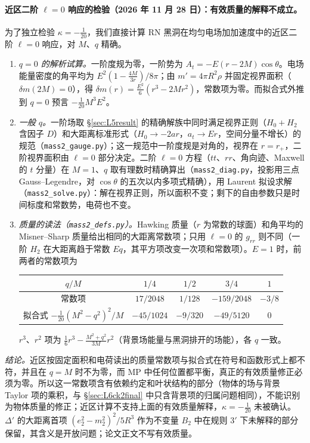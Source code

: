 \documentclass[11pt,a4paper]{ctexart}
\numberwithin{equation}{section}
\begin{document}
\paragraph{近区二阶 $\ell=0$ 响应的检验（2026 年 11 月 28 日）：有效质量的解释不成立。}为了独立检验 $\kappa=-\tfrac1{20}$，我们直接计算 RN 黑洞在均匀电场加加速度中的近区二阶 $\ell=0$ 响应，对 $M$、$q$ 精确。
\begin{enumerate}
\item \emph{$q=0$ 的解析试算。}一阶度规为零，一阶势为 $A_t=-E(r-2M)\cos\theta$。电场能量密度的角平均为 $E^2(1-\tfrac{4M}{3r})/8\pi$；由 $m'=4\pi R^2\rho$ 并固定视界面积（$\delta m(2M)=0$），得 $\delta m(r)=\tfrac{E^2}6(r^3-2Mr^2)$，常数项为零。而拟合式外推到 $q=0$ 预言 $-\tfrac1{20}M^3E^2$。
\item \emph{一般 $q$。}一阶场取 \S\ref{sec:L5result} 的精确解族中同时满足视界正则（$H_0+H_2$ 含因子 $D$）和大距离标准形式（$H_0\to-2ar$，$a_t\to Er$，空间分量不增长）的规范（\texttt{mass2\_gauge.py}）；这一规范中一阶度规是对角的，视界在 $r=r_+$，二阶视界面积由 $\ell=0$ 部分决定。二阶 $\ell=0$ 方程（$tt$、$rr$、角向迹、Maxwell 的 $t$ 分量）在 $M=1$、$q$ 取有理数时精确算出（\texttt{mass2\_diag.py}，投影用三点 Gauss--Legendre，对 $\cos\theta$ 的五次以内多项式精确），用 Laurent 拟设求解（\texttt{mass2\_solve.py}）：解在视界正则，所以面积不变；剩下的自由参数只是时间标度和常数势，电荷也不变。
\item \emph{质量的读法（\texttt{mass2\_defs.py}）。}Hawking 质量（$r$ 为常数的球面）和角平均的 Misner--Sharp 质量给出相同的大距离常数项；只用 $\ell=0$ 的 $g_{rr}$ 则不同（一阶 $H_2$ 在大距离趋于常数 $Eq$，其平方项改变一次项和常数项）。$E=1$ 时，前两者的常数项为
\begin{center}\small
\begin{tabular}{ccccc}
\hline
$q/M$ & $1/4$ & $1/2$ & $3/4$ & $1$\\
\hline
常数项 & $17/2048$ & $1/128$ & $-159/2048$ & $-3/8$\\
拟合式 $-\tfrac1{20}(M^2-q^2)^2/M$ & $-45/1024$ & $-9/320$ & $-49/5120$ & $0$\\
\hline
\end{tabular}
\end{center}
$r^3$、$r^2$ 项为 $\tfrac16r^3-\tfrac{M^2+q^2}{3M}r^2$（背景场能量与黑洞排开的场能），各 $q$ 一致。
\end{enumerate}
\emph{结论。}近区按固定面积和电荷读出的质量常数项与拟合式在符号和函数形式上都不符，并且在 $q=M$ 时不为零，而 MP 中任何位置都平衡，真正的有效质量修正必须为零。所以这一常数项含有依赖约定和叶状结构的部分（物体的场与背景 Taylor 项的乘积，与 \S\ref{sec:L6ck2final} 中只含背景项的归属问题相同），不能识别为物体质量的修正；近区计算不支持上面的有效质量解释，$\kappa=-\tfrac1{20}$ 未被确认。$\Delta'$ 的大距离首项 $(e_2^2-m_2^2)^2/5R^3$ 作为不变量 $B_2$ 中在规则 3$'$ 下未解释的部分保留，其含义是开放问题；论文正文不写有效质量。
\end{document}
